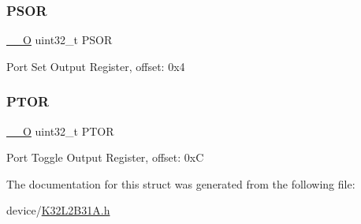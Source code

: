 \subsubsection{\texorpdfstring{PSOR}{PSOR}}
{\footnotesize\ttfamily \mbox{\hyperlink{core__cm0plus_8h_a7e25d9380f9ef903923964322e71f2f6}{\+\_\+\+\_\+O}} uint32\+\_\+t P\+S\+OR}

Port Set Output Register, offset\+: 0x4 \mbox{\label{struct_g_p_i_o___type_a1c26bce9144a9606d3f8a60dc750b063}} 
\subsubsection{\texorpdfstring{PTOR}{PTOR}}
{\footnotesize\ttfamily \mbox{\hyperlink{core__cm0plus_8h_a7e25d9380f9ef903923964322e71f2f6}{\+\_\+\+\_\+O}} uint32\+\_\+t P\+T\+OR}

Port Toggle Output Register, offset\+: 0xC 

The documentation for this struct was generated from the following file\+:\begin{DoxyCompactItemize}
\item 
device/\mbox{\hyperlink{_k32_l2_b31_a_8h}{K32\+L2\+B31\+A.\+h}}\end{DoxyCompactItemize}
